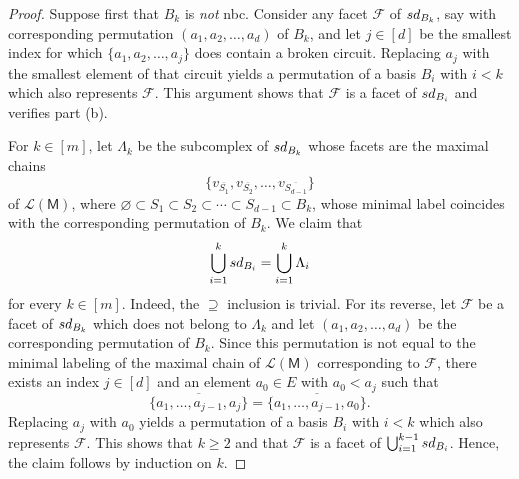 \documentclass[11pt]{amsart}
\theoremstyle{theorems}
\theoremstyle{definition}
\newcommand{\sd}{{\rm sd}}
\newcommand{\lL}{{\mathcal L}}
\newcommand{\M}{{\mathsf{M}}}
\begin{document}
\begin{proof}
    Suppose first that $B_k$ is \emph{not} nbc. Consider 
    any facet $\mathscr{F}$ of $\sd_{B_k}$, say with corresponding 
    permutation $(a_1, a_2,\dots,a_d)$ of $B_k$, and let
    $j \in [d]$ be the smallest index for which $\{a_1, 
    a_2,\dots,a_j\}$ does contain a broken circuit. Replacing 
    $a_j$ with the smallest element of that circuit 
    yields a permutation of a basis $B_i$ with $i<k$ 
    which also represents $\mathscr{F}$. This argument shows that 
    $\mathscr{F}$ is a facet of $\sd_{B_i}$ and verifies part (b).
    
    For $k \in [m]$, let $\Lambda_k$ be the subcomplex 
    of $\sd_{B_k}$ whose facets are the maximal chains 
    \[ \{ v_{\overline{S_1}}, 
          v_{\overline{S_2}},\dots,v_{\overline{S_{d-1}}} 
    			\} \]
    of $\lL(\M)$, where $\varnothing \subset S_1 \subset 
    S_2 \subset \cdots \subset S_{d-1} \subset B_k$, 
    whose minimal label coincides with the corresponding
    permutation of $B_k$. We claim that 
    \begin{equation} \label{eq:unions}
      \bigcup_{i=1}^k \sd_{B_i} = \bigcup_{i=1}^k 
    	\Lambda_i
    \end{equation}
    for every $k \in [m]$. Indeed, the $\supseteq$ 
    inclusion is trivial. For its reverse, let $\mathscr{F}$ be 
    a facet of $\sd_{B_k}$ which does not belong to 
    $\Lambda_k$ and let $(a_1, a_2,\dots,a_d)$ be the 
    corresponding permutation of $B_k$. Since this 
    permutation is not equal to the minimal labeling 
    of the maximal chain of $\lL(\M)$ corresponding to
    $\mathscr{F}$, there exists an index $j \in [d]$ and an 
    element $a_0 \in E$ with $a_0 < a_j$ such that 
    \[ \overline{ \{a_1,\dots,a_{j-1}, a_j\} } = 
		   \overline{ \{a_1,\dots,a_{j-1}, a_0\}}. \]
		Replacing $a_j$ with $a_0$ yields a permutation 
    of a basis $B_i$ with $i<k$ which also represents 
    $\mathscr{F}$. This shows that $k \ge 2$ and that 
		$\mathscr{F}$ is a facet of $\bigcup_{i=1}^{k-1} 
		\sd_{B_i}$. Hence, the claim follows by induction on $k$. 
     

\end{proof}
\end{document}
